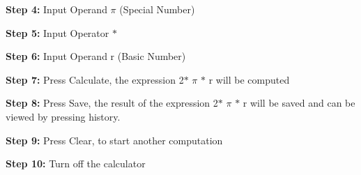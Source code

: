 \documentclass[12pt]{article}
\begin{document}
\begin{justify}
\textbf{Step 4: }Input Operand $ \pi $  (Special Number)
\end{justify}\par

\begin{justify}
\textbf{Step 5: }Input Operator $\ast$ 
\end{justify}\par

\begin{justify}
\textbf{Step 6: }Input Operand r (Basic Number)
\end{justify}\par

\begin{justify}
\textbf{Step 7: }Press Calculate, the expression 2$\ast$ $ \pi $ $\ast$ r will be computed
\end{justify}\par

\begin{justify}
\textbf{Step 8: }Press Save, the result of the expression 2$\ast$ $ \pi $ $\ast$ r will be saved and can be viewed by pressing history.
\end{justify}\par

\begin{justify}
\textbf{Step 9: }Press Clear, to start another computation
\end{justify}\par

\begin{justify}
\textbf{Step 10: }Turn off the calculator
\end{justify}\par


\vspace{\baselineskip}

\vspace{\baselineskip}

\vspace{\baselineskip}

\vspace{\baselineskip}

\vspace{\baselineskip}

\vspace{\baselineskip}

\vspace{\baselineskip}

\vspace{\baselineskip}
\end{document}
